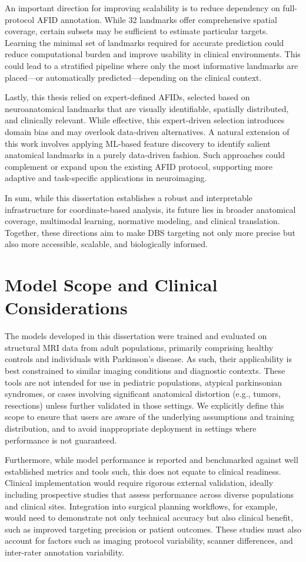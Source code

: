 An important direction for improving scalability is to reduce dependency on full-protocol AFID annotation. While 32 landmarks offer comprehensive spatial coverage, certain subsets may be sufficient to estimate particular targets. Learning the minimal set of landmarks required for accurate prediction could reduce computational burden and improve usability in clinical environments. This could lead to a stratified pipeline where only the most informative landmarks are placed—or automatically predicted—depending on the clinical context.

Lastly, this thesis relied on expert-defined AFIDs, selected based on neuroanatomical landmarks that are visually identifiable, spatially distributed, and clinically relevant. While effective, this expert-driven selection introduces domain bias and may overlook data-driven alternatives. A natural extension of this work involves applying ML-based feature discovery to identify salient anatomical landmarks in a purely data-driven fashion. Such approaches could complement or expand upon the existing AFID protocol, supporting more adaptive and task-specific applications in neuroimaging.

In sum, while this dissertation establishes a robust and interpretable infrastructure for coordinate-based analysis, its future lies in broader anatomical coverage, multimodal learning, normative modeling, and clinical translation. Together, these directions aim to make DBS targeting not only more precise but also more accessible, scalable, and biologically informed.

\section{Model Scope and Clinical Considerations}
The models developed in this dissertation were trained and evaluated on structural MRI data from adult populations, primarily comprising healthy controls and individuals with Parkinson’s disease. As such, their applicability is best constrained to similar imaging conditions and diagnostic contexts. These tools are not intended for use in pediatric populations, atypical parkinsonian syndromes, or cases involving significant anatomical distortion (e.g., tumors, resections) unless further validated in those settings. We explicitly define this scope to ensure that users are aware of the underlying assumptions and training distribution, and to avoid inappropriate deployment in settings where performance is not guaranteed.

Furthermore, while model performance is reported and benchmarked against well established metrics and tools such, this does not equate to clinical readiness. Clinical implementation would require rigorous external validation, ideally including prospective studies that assess performance across diverse populations and clinical sites. Integration into surgical planning workflows, for example, would need to demonstrate not only technical accuracy but also clinical benefit, such as improved targeting precision or patient outcomes. These studies must also account for factors such as imaging protocol variability, scanner differences, and inter-rater annotation variability.

